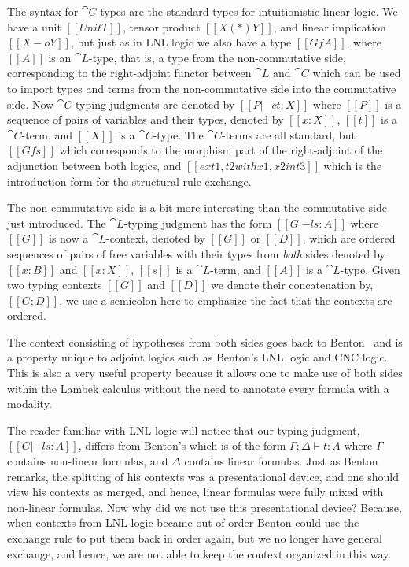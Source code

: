 The syntax for $\cat{C}$-types are the standard types for
intuitionistic linear logic.  We have a unit $[[UnitT]]$, tensor
product $[[X (*) Y]]$, and linear implication $[[X -o Y]]$, but just
as in LNL logic we also have a type $[[Gf A]]$, where $[[A]]$ is an
$\cat{L}$-type, that is, a type from the non-commutative side,
corresponding to the right-adjoint functor between $\cat{L}$ and
$\cat{C}$ which can be used to import types and terms from the
non-commutative side into the commutative side.  Now $\cat{C}$-typing
judgments are denoted by $[[P |-c t : X]]$ where $[[P]]$ is a sequence
of pairs of variables and their types, denoted by $[[x : X]]$, $[[t]]$
is a $\cat{C}$-term, and $[[X]]$ is a $\cat{C}$-type.  The
$\cat{C}$-terms are all standard, but $[[Gf s]]$ which corresponds to
the morphism part of the right-adjoint of the adjunction between both
logics, and $[[ex t1 , t2 with x1 , x2 in t3]]$ which is the
introduction form for the structural rule exchange.

The non-commutative side is a bit more interesting than the
commutative side just introduced.  The $\cat{L}$-typing judgment has
the form $[[G |-l s : A]]$ where $[[G]]$ is now a $\cat{L}$-context,
denoted by $[[G]]$ or $[[D]]$, which are ordered sequences of pairs of
free variables with their types from \emph{both} sides denoted by $[[x
    : B]]$ and $[[x : X]]$, $[[s]]$ is a $\cat{L}$-term, and $[[A]]$
is a $\cat{L}$-type.  Given two typing contexts $[[G]]$ and $[[D]]$ we
denote their concatenation by, $[[G;D]]$, we use a semicolon here to
emphasize the fact that the contexts are ordered.

The context consisting of hypotheses from both sides goes back to
Benton~\cite{Benton:1994} and is a property unique to adjoint logics
such as Benton's LNL logic and CNC logic.  This is also a very useful
property because it allows one to make use of both sides within the
Lambek calculus without the need to annotate every formula with a
modality.

The reader familiar with LNL logic will notice that our
typing judgment, $[[G |-l s : A]]$, differs from Benton's which is of
the form $\Gamma;\Delta \vdash t : A$ where $\Gamma$ contains
non-linear formulas, and $\Delta$ contains linear formulas.  Just as
Benton remarks, the splitting of his contexts was a presentational
device, and one should view his contexts as merged, and hence, linear
formulas were fully mixed with non-linear formulas.  Now why did we
not use this presentational device?  Because, when contexts from LNL
logic became out of order Benton could use the exchange rule to put
them back in order again, but we no longer have general exchange, and
hence, we are not able to keep the context organized in this way.

